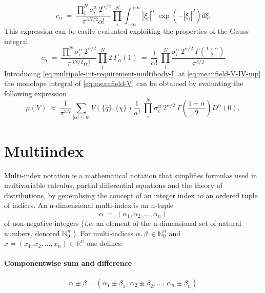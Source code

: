 \documentclass[11pt,a4paper]{article}
\begin{document}
 \begin{equation}
 \label{eq:multipole-int-requirement-multibody}
 c_{\alpha}\ =\ \frac{\prod^{N}_{i} \sigma_i^{\alpha}\ 2^{\alpha/2}}{\pi^{3N/2} \alpha !} \prod^{N}_{i} \int_{-\infty}^{+\infty} |\xi_{i}|^{\alpha}\ \exp \left(-|\xi_{i}|^2\right) d\xi.
 \end{equation}
This expression can be easily evaluated exploiting the properties of the Gauss integral
\begin{equation}
    \label{eq:multipole-int-requirement-multibody-I}
    c_{\alpha}\ =\ \frac{\prod^{N}_{i} \sigma_i^{\alpha}\ 2^{\alpha/2}}{\pi^{3N/2} \alpha !} \prod^{N}_{i} 2\ \Gamma_{\alpha}(1)\ =\ \frac{1}{\alpha !}\  \prod^{N}_{i} \frac{\sigma_i^{\alpha}\ 2^{\alpha/2}\ \Gamma(\frac{1+\alpha}{2})}{\pi^{3/2}}
\end{equation}
Introducing \cref{eq:multipole-int-requirement-multibody-I} at \cref{eq:meanfield-V-IV-mp} the monolope integral of \cref{eq:meanfield-V} can be obtained by evaluating the following expression
\begin{equation} \label{eq:meanfield-V-V-mp}
    \mu(V)\ \approx\ \frac{1}{\pi^{3N}} \sum_{|\alpha| \leq m} V(\{\bar{q}\},\{\chi\})\frac{1}{\alpha !}\  \prod^{N}_{i} \sigma_i^{\alpha}\ 2^{\alpha/2}\ \Gamma(\frac{1+\alpha}{2}) D^{\alpha} \left(0\right),
\end{equation}

\newpage
 \appendix
 
 \section{Multiindex}
 
 Multi-index notation is a mathematical notation that simplifies formulas used in multivariable calculus, partial differential equations and the theory of distributions, by generalising the concept of an integer index to an ordered tuple of indices. An n-dimensional multi-index is an n-tuple
\begin{equation}
\alpha\ =\ \left(\alpha_1, \alpha_2,\ldots,\alpha_n \right)
\end{equation}
of non-negative integers ({\it i.e.} an element of the n-dimensional set of natural numbers, denoted $\mathbb{N}^n_0$ ). For multi-indices $\alpha, \beta\ \in \mathbb{N}^n_0$ and  $x = (x_1, x_2, \ldots, x_n) \in \mathbb{R}^n$ one defines:

\paragraph{Componentwise sum and difference}
\begin{equation}
\alpha \pm \beta= (\alpha_1 \pm \beta_1,\,\alpha_2 \pm \beta_2, \ldots, \,\alpha_n \pm \beta_n)
\end{equation}
\end{document}
